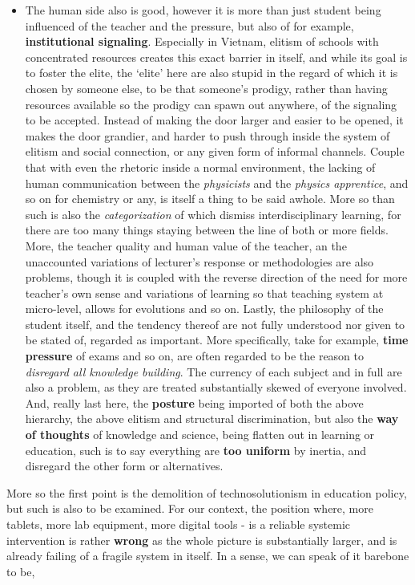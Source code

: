 \documentclass[10pt,a4paper]{article}
\begin{document}
\begin{itemize}
    \item The human side also is good, however it is more than just student being influenced of the teacher and the pressure, but also of for example, \textbf{institutional signaling}. Especially in Vietnam, elitism of schools with concentrated resources creates this exact barrier in itself, and while its goal is to foster the elite, the `elite' here are also stupid in the regard of which it is chosen by someone else, to be that someone's prodigy, rather than having resources available so the prodigy can spawn out anywhere, of the signaling to be accepted. Instead of making the door larger and easier to be opened, it makes the door grandier, and harder to push through inside the system of elitism and social connection, or any given form of informal channels. Couple that with even the rhetoric inside a normal environment, the lacking of human communication between the \textit{physicists} and the \textit{physics apprentice}, and so on for chemistry or any, is itself a thing to be said awhole. More so than such is also the \textit{categorization} of which dismiss interdisciplinary learning, for there are too many things staying between the line of both or more fields. More, the teacher quality and human value of the teacher, an the unaccounted variations of lecturer's response or methodologies are also problems, though it is coupled with the reverse direction of the need for more teacher's own sense and variations of learning so that teaching system at micro-level, allows for evolutions and so on. Lastly, the philosophy of the student itself, and the tendency thereof are not fully understood nor given to be stated of, regarded as important. More specifically, take for example, \textbf{time pressure} of exams and so on, are often regarded to be the reason to \textit{disregard all knowledge building}. The currency of each subject and in full are also a problem, as they are treated substantially skewed of everyone involved. And, really last here, the \textbf{posture} being imported of both the above hierarchy, the above elitism and structural discrimination, but also the \textbf{way of thoughts} of knowledge and science, being flatten out in learning or education, such is to say everything are \textbf{too uniform} by inertia, and disregard the other form or alternatives.  
\end{itemize}

More so the first point is the demolition of technosolutionism in education policy, but such is also to be examined. For our context, the position where, more tablets, more lab equipment, more digital tools - is a reliable systemic intervention is rather \textbf{wrong} as the whole picture is substantially larger, and is already failing of a fragile system in itself. In a sense, we can speak of it barebone to be,
\end{document}
